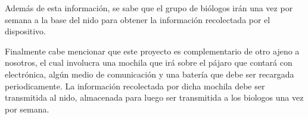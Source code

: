 Además de esta información, se sabe que el grupo de biólogos irán una vez por semana a la base del nido para obtener la información recolectada por el dispositivo.

Finalmente cabe mencionar que este proyecto es complementario de otro ajeno a nosotros, el cual involucra una mochila que irá sobre el pájaro que contará con electrónica, algún medio de comunicación y una batería que debe ser recargada periodicamente.
La información recolectada por dicha mochila debe ser transmitida al nido, almacenada para luego ser transmitida a los biologos una vez por semana.

%